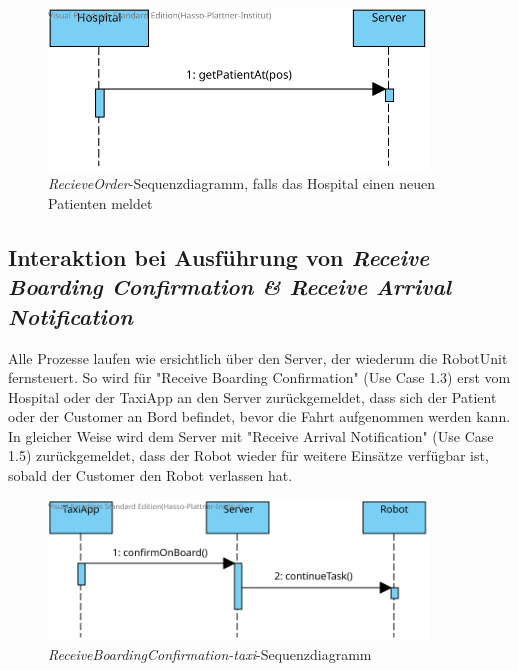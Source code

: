 \begin{figure}[H]
	\centering
	\includegraphics[width=0.9\textwidth]{img/2-Entwurf-ReceiveOrder-Hosp}
	\caption{\emph{RecieveOrder}-Sequenzdiagramm, falls das Hospital einen neuen Patienten meldet}
	\label{SequenzDiagrammInteraktion}
\end{figure}



\subsection*{Interaktion bei Ausführung von \emph{Receive Boarding Confirmation \& Receive Arrival Notification}}

Alle Prozesse laufen wie ersichtlich über den Server, der wiederum die RobotUnit fernsteuert. 
So wird für "Receive Boarding Confirmation" (Use Case 1.3) erst vom Hospital oder der TaxiApp an den Server zurückgemeldet, dass sich der Patient oder der Customer an Bord befindet, bevor die Fahrt aufgenommen werden kann. 
In gleicher Weise wird dem Server mit "Receive Arrival Notification" (Use Case 1.5) zurückgemeldet, dass der Robot wieder für weitere Einsätze verfügbar ist, sobald der Customer den Robot verlassen hat.  \\

\begin{figure}[H]
	\centering
	\includegraphics[width=0.9\textwidth]{img/2-Entwurf-ReceiveBoardingConfirmation-taxi}
	\caption{\emph{ReceiveBoardingConfirmation-taxi}-Sequenzdiagramm}
	\label{SequenzDiagrammInteraktion}
\end{figure}

